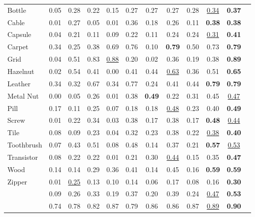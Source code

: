 \documentclass[final]{cvpr}
\begin{document}
\begin{table*}[htbp]
\begin{center}
\begin{tabular}{lc cc cc cc cc cc}
			Bottle     		 & 0.05 & 0.28 & 0.22 & 0.15 & 0.27 & 0.27 & 0.27 & 0.28 & \underline{0.34} & \textbf{0.37}  \\
			\rowcolor{mygray}
			Cable      		 & 0.01 & 0.27 & 0.05 & 0.01 & 0.36 & 0.18 & 0.26 & 0.11 & \textbf{0.38}    & \textbf{0.38} \\
			Capsule    		 & 0.04 & 0.21 & 0.11 & 0.09 & 0.22 & 0.11 & 0.24 & 0.24 & \underline{0.31} & \textbf{0.41} \\
			\rowcolor{mygray}
			Carpet     		 & 0.34 & 0.25 & 0.38 & 0.69 & 0.76 & 0.10 & \textbf{0.79} & 0.50 & 0.73 & \textbf{0.79} \\
			Grid       		 & 0.04 & 0.51 & 0.83 & \underline{0.88} & 0.20 & 0.02 & 0.36 & 0.19 & 0.38 & \textbf{0.89} \\
			\rowcolor{mygray}
			Hazelnut   		 & 0.02 & 0.54 & 0.41 & 0.00 & 0.41 & 0.44 & \underline{0.63} & 0.36 & 0.51 & \textbf{0.65} \\
			Leather    		 & 0.34 & 0.32 & 0.67 & 0.34 & 0.77 & 0.24 & 0.41 & 0.44 & \textbf{0.79} & \textbf{0.79} \\
			\rowcolor{mygray}
			Metal Nut  		 & 0.00 & 0.05 & 0.26 & 0.01 & 0.38 & \textbf{0.49} & 0.22 & 0.31 & 0.45 & \underline{0.47} \\
			Pill       		 & 0.17 & 0.11 & 0.25 & 0.07 & 0.18 & 0.18 & \underline{0.48} & 0.23 & 0.40 & \textbf{0.49} \\
			\rowcolor{mygray}
			Screw      		 & 0.01 & 0.22 & 0.34 & 0.03 & 0.38 & 0.17 & 0.38 & 0.17 & \textbf{0.48} & \underline{0.44} \\
			Tile       		 & 0.08 & 0.09 & 0.23 & 0.04 & 0.32 & 0.23 & 0.38 & 0.22 & \underline{0.38} & \textbf{0.40} \\
			\rowcolor{mygray}
			Toothbrush 		 & 0.07 & 0.43 & 0.51 & 0.08 & 0.48 & 0.14 & 0.37 & 0.21 & \textbf{0.57} & \underline{0.53} \\
			Transistor 		 & 0.08 & 0.22 & 0.22 & 0.01 & 0.21 & 0.30 & \underline{0.44} & 0.15 & 0.35 & \textbf{0.47} \\
			\rowcolor{mygray}
			Wood       		 & 0.14 & 0.14 & 0.29 & 0.36 & 0.41 & 0.14 & 0.45 & 0.16 & \textbf{0.59} & \textbf{0.59} \\
			Zipper     		 & 0.01 & \underline{0.25} & 0.13 & 0.10 & 0.14 & 0.06 & 0.17 & 0.08 & 0.16 & \textbf{0.30} \\
			\hline
			\specialrule{0em}{1pt}{1pt}
			\rowcolor{mygray}
			   & 0.09 & 0.26 & 0.33 & 0.19 & 0.37 & 0.20 & 0.39 & 0.24 & \underline{0.47} & \textbf{0.53} \\
			 & 0.74 & 0.78 & 0.82 & 0.87 & 0.79 & 0.86 & 0.86 & 0.87 & \underline{0.89} & \textbf{0.90} \\
			\bottomrule[1.2pt]
		\end{tabular}
	\end{center}
	\vspace{-0.5cm}
\end{table*}
\end{document}
